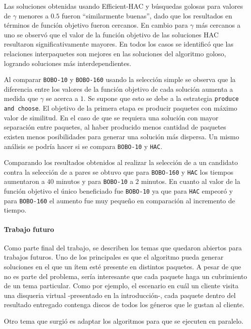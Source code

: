 Las soluciones obtenidas usando Efficient-HAC y búsquedas golosas para valores de $\gamma$ menores a $0.5$ fueron \textquotedblleft similarmente buenas\textquotedblright , dado que los resultados en términos de función objetivo fueron cercanos. En cambio para $\gamma$ más cercanos a uno se observó que el valor de la función objetivo de las soluciones HAC resultaron significativamente mayores. En todos los casos se identificó que las relaciones interpaquetes son mejores en las soluciones del algoritmo goloso, logrando soluciones más interdependientes.

Al comparar \texttt{BOBO-10} y \texttt{BOBO-160} usando la selección simple se observa que la diferencia entre los valores de la función objetivo de cada solución aumenta a medida que $\gamma$ se acerca a $1$. Se supone que esto se debe a la estrategia \texttt{produce and choose}. El objetivo de la primera etapa es producir paquetes con máximo valor de similitud. En el caso de que se requiera una solución con mayor separación entre paquetes, al haber producido menos cantidad de paquetes existen menos posibilidades para generar una solución más dispersa. Un mismo análisis se podría hacer si se compara \texttt{BOBO-10} y \texttt{HAC}.

Comparando los resultados obtenidos al realizar la selección de a un candidato contra la selección de a pares se obtuvo que para \texttt{BOBO-160} y \texttt{HAC} los tiempos aumentaron a $40$ minutos y para \texttt{BOBO-10} a $2$ minutos. En cuanto al valor de la función objetivo el único beneficiado fue \texttt{BOBO-10} ya que para \texttt{HAC} empeoró y para \texttt{BOBO-160} el aumento fue muy pequeño en comparación al incremento de tiempo.

\paragraph{Trabajo futuro} Como parte final del trabajo, se describen los temas que quedaron abiertos para trabajos futuros. Uno de los principales es que el algoritmo pueda generar soluciones en el que un ítem esté presente en distintos paquetes. A pesar de que no es parte del problema, sería interesante que cada paquete haga un cubrimiento de un tema particular. Como por ejemplo, el escenario en cuál un cliente visita una disqueria virtual -presentado en la introducción-, cada paquete dentro del resultado entregado contenga discos de todos los géneros que le gustan al cliente.

Otro tema que surgió es adaptar los algoritmos para que se ejecuten en paralelo.
